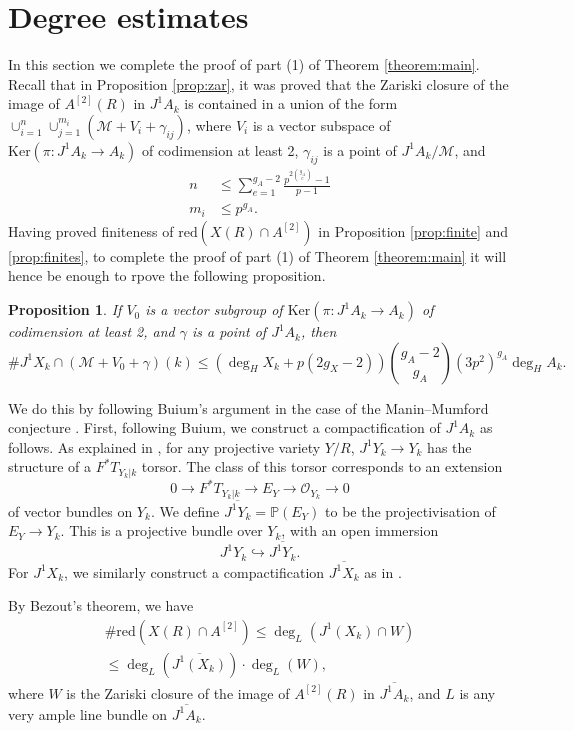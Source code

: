 \documentclass[11pt]{amsart}
\newcommand{\Ker}{\mathrm{Ker}}
\theoremstyle{plain}
\newtheorem{proposition}{Proposition}
\theoremstyle{definition}
\newcommand{\red}{\mathrm{red}}
\begin{document}
\section{Degree estimates}\label{sec:finiteness}

In this section we complete the proof of part (1) of Theorem \ref{theorem:main}. Recall that in Proposition \ref{prop:zar}, it was proved that the Zariski closure of the image of $A^{[2]}(R)$ in $J^1 A_k $ is contained in a union of the form $\cup _{i=1}^n \cup _{j=1}^{m_i} (\mathcal{M} +V_i +\gamma _{ij} )$, where $V_i$ is a vector subspace of $\Ker (\pi : J^1 A_k \to A_k )$ of codimension at least 2, $\gamma _{ij}$ is a point of $J^1 A_k /\mathcal{M}$, and 
\begin{align*}
n & \leq \sum _{e=1}^{g_A -2}\frac{p^{2\binom{g_A }{e}}-1}{p-1}\\
m_i & \leq p^{g_A} .
\end{align*}
Having proved finiteness of $\red (X(R)\cap A^{[2]})$ in Proposition \ref{prop:finite} and \ref{prop:finites}, to complete the proof of part (1) of Theorem \ref{theorem:main} it will hence be enough to rpove the following proposition.
\begin{proposition}\label{prop:deg_buium}
If $V_0$ is a vector subgroup of $\Ker (\pi :J^1 A_k \to A_k )$ of codimension at least 2, and $\gamma $ is a point of $J^1 A_k $, then
\[
\# J^1 X_k \cap (\mathcal{M}+V_0 +\gamma )(k)\leq (\deg _H X_k +p(2g_X -2))\binom{g_A -2}{g_A}(3p^2 )^{g_A}\deg _H A_k .
\]
\end{proposition}
We do this by following Buium's argument in the case of the Manin--Mumford conjecture \cite{buium:96}. First, following Buium, we construct a compactification of $J^1 A_k $ as follows. As explained in \cite{buium:96}, for any projective variety $Y/R$, $J^1 Y_k \to Y_k$ has the structure of a $F^* T_{Y_k |k}$ torsor. The class of this torsor corresponds to an extension
\[
0\to F^* T_{Y_k |k}\to E_Y \to \mathcal{O}_{Y_k }\to 0
\]
of vector bundles on $Y_k $. We define $\overline{J^1 Y_k }=\mathbb{P}(E_Y )$ to be the projectivisation of $E_Y \to Y_k $. This is a projective bundle over $Y_k$, with an open immersion
\[
J^1 Y_k \hookrightarrow \overline{J^1 Y_k }.
\]
For $J^1 X_k$, we similarly construct a compactification $\overline{J^1 X_k }$ as in \cite{buium:96}.

By Bezout's theorem, we have
\begin{align*}
\# \red (X(R)\cap A^{[2]})\leq \deg _{L} (J^1 (X_k )\cap W) \\
\leq \deg _{L} (\overline{J^1 (X_k )})\cdot \deg _{L}(W),
\end{align*}
where $W$ is the Zariski closure of the image of $A^{[2]}(R)$ in $\overline{J^1 A_k }$, and $L$ is any very ample line bundle on $\overline{J^1 A_k }$. 
\end{document}
